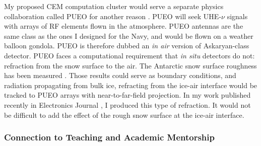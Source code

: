 \documentclass[../../../main.tex]{subfiles}
\begin{document}
My proposed CEM computation cluster would serve a separate physics collaboration called PUEO for another reason \cite{pueo}.  PUEO will seek UHE-$\nu$ signals with arrays of RF elements flown in the atmosphere.  PUEO antennas are the same class as the ones I designed for the Navy, and would be flown on a weather balloon gondola.  PUEO is therefore dubbed an \textit{in air} version of Askaryan-class detector.  PUEO faces a computational requirement that \textit{in situ} detectors do not: refraction from the snow surface to the air.  The Antarctic snow surface roughness has been measured \cite{doi:10.1142/S2251171717400025}.  Those results could serve as boundary conditions, and radiation propagating from bulk ice, refracting from the ice-air interface would be tracked to PUEO arrays with near-to-far-field projection.  In my work published recently in Electronics Journal \cite{electronics10040415}, I produced this type of refraction.  It would not be difficult to add the effect of the rough snow surface at the ice-air interface.

\subsubsection{Connection to Teaching and Academic Mentorship}
\end{document}
